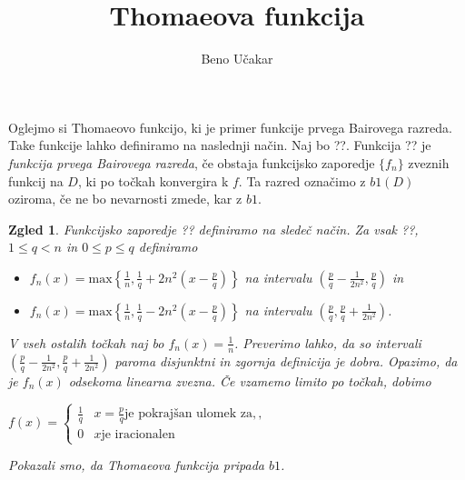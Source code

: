 \documentclass[a4paper,14pt]{article}
\title{Thomaeova funkcija}
\author{Beno Učakar}
\date{}
\newtheorem{zgled}{Zgled}[section]}
\begin{document}
\maketitle
Oglejmo si Thomaeovo funkcijo, ki je primer funkcije prvega Bairovega razreda.
Take funkcije lahko definiramo na naslednji način.
Naj bo ??. Funkcija ?? je \emph{funkcija prvega Bairovega razreda}, 
če obstaja funkcijsko zaporedje $\{f_n\}$ zveznih funkcij na $D$, ki po točkah konvergira k $f$. 
Ta razred označimo z $b1(D)$ oziroma, če ne bo nevarnosti zmede, kar z $b1$.

\begin{zgled}
    Funkcijsko zaporedje ?? definiramo na sledeč način.
    Za vsak ??, $1 \le q < n$ in $0 \le p \le q$ definiramo
    \begin{itemize}
        \item \(f_n(x) = \text{max}\left\{\frac{1}{n}, \frac{1}{q} + 2n^2\left(x - \frac{p}{q}\right)\right\}\) na intervalu \(\left(\frac{p}{q} - \frac{1}{2n^2}, \frac{p}{q}\right)\) in
        \item \(f_n(x) = \text{max}\left\{\frac{1}{n}, \frac{1}{q} - 2n^2\left(x - \frac{p}{q}\right)\right\}\) na intervalu \(\left(\frac{p}{q}, \frac{p}{q} + \frac{1}{2n^2}\right)\).
    \end{itemize}
    V vseh ostalih točkah naj bo $f_n(x) = \frac{1}{n}$.
    Preverimo lahko, da so intervali $\left(\frac{p}{q} - \frac{1}{2n^2}, \frac{p}{q} + \frac{1}{2n^2}\right)$ paroma disjunktni in zgornja definicija je dobra.
    Opazimo, da je $f_n(x)$ odsekoma linearna zvezna. Če vzamemo limito po točkah, dobimo

    $f(x) = \begin{cases} \frac{1}{q} & x = \frac{p}{q}\text{je pokrajšan ulomek za},, \\ 0 & x \text{je iracionalen} \end{cases}$

    Pokazali smo, da \emph{Thomaeova funkcija} pripada $b1$. 
\end{zgled}

\end{document}
